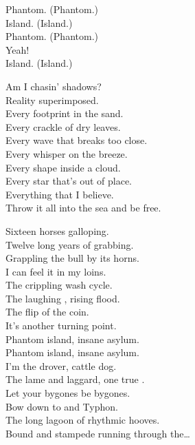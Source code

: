 
Phantom. (Phantom.) \\
Island. (Island.) \\
Phantom. (Phantom.) \\
Yeah! \\
Island. (Island.) \\


Am I chasin' shadows? \\
Reality superimposed. \\
Every footprint in the sand. \\
Every crackle of dry leaves. \\
Every wave that breaks too close. \\
Every whisper on the breeze. \\
Every shape inside a cloud. \\
Every star that's out of place. \\
Everything that I believe. \\
Throw it all into the sea and be free. \\


Sixteen horses galloping. \\
Twelve long years of grabbing. \\
Grappling the bull by its horns. \\
I can feel it in my loins. \\
The crippling  wash cycle. \\
The laughing , rising flood. \\
The flip of the coin. \\
It's another turning point. \\

Phantom island, insane asylum. \\
Phantom island, insane asylum. \\
I'm the drover, cattle dog. \\
The lame and laggard, one true . \\

Let your bygones be bygones. \\
Bow down to  and Typhon. \\
The long lagoon of rhythmic hooves. \\
Bound and stampede running through the… \\

